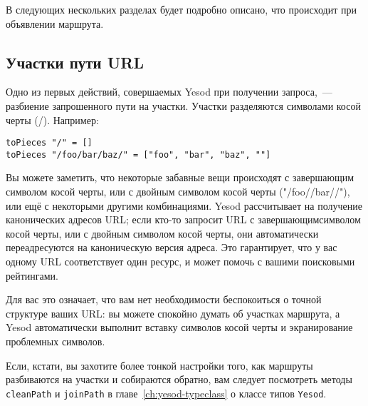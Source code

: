 В следующих нескольких разделах будет подробно описано, что происходит
при объявлении маршрута.

\subsection{Участки пути URL}
Одно из первых действий, совершаемых Yesod при получении запроса,~---
разбиение запрошенного пути на участки.  Участки разделяются символами
косой черты (/). Например:
\begin{lstlisting}
toPieces "/" = []
toPieces "/foo/bar/baz/" = ["foo", "bar", "baz", ""]
\end{lstlisting}

Вы можете заметить, что некоторые забавные вещи происходят с
завершающим символом косой черты, или с двойным символом косой черты
("/foo//bar//"), или ещё с некоторыми другими комбинациями.
Yesod рассчитывает на получение канонических адресов URL; если кто-то
запросит URL с завершающимсимволом косой черты, или с двойным символом
косой черты, они автоматически переадресуются на каноническую версия адреса.
Это гарантирует, что у вас одному URL соответствует один ресурс, и может
помочь с вашими поисковыми рейтингами.

Для вас это означает, что вам нет необходимости беспокоиться о точной
структуре ваших URL: вы можете спокойно думать об участках
маршрута, а Yesod автоматически выполнит вставку символов косой черты
и экранирование проблемных символов.

Если, кстати, вы захотите более тонкой настройки того, как маршруты
разбиваются на участки и собираются обратно, вам следует посмотреть
методы \lstinline!cleanPath! и \lstinline!joinPath! в главе~\ref{ch:yesod-typeclass}
о классе типов \lstinline!Yesod!.


